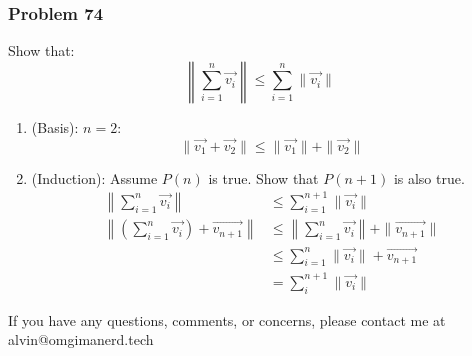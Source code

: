 \documentclass[letterpaper, 12pt]{math}
\begin{document}
\subsubsection*{Problem 74}
Show that:
\[ \left\|\sum_{i=1}^{n}\vec{v_i}\right\| \le \sum_{i=1}^{n}\|\vec{v_i}\| \]
\begin{enumerate}
  \item (Basis): \( n = 2 \):
    \[ \|\vec{v_1}+\vec{v_2}\| \le \|\vec{v_1}\|+\|\vec{v_2}\| \]
  \item (Induction): Assume \( P(n) \) is true. Show that \( P(n+1) \) is also
    true.
    \begin{align*}
      \left\|\sum_{i=1}^{n}\vec{v_i}\right\| &\le
        \sum_{i=1}^{n+1}\|\vec{v_i}\| \\
      \left\|(\sum_{i=1}^{n}\vec{v_i})+\vec{v_{n+1}}\right\|
      &\le \left\|\sum_{i=1}^{n}\vec{v_i}\right\|+\|\vec{v_{n+1}}\| \\
      &\le \sum_{i=1}^{n}\|\vec{v_{i}}\|+\vec{v_{n+1}} \\
      &= \sum_{i}^{n+1}\|\vec{v_i}\|
    \end{align*}
\end{enumerate}

\begin{center}
  If you have any questions, comments, or concerns, please contact me at
  alvin@omgimanerd.tech
\end{center}
\end{document}
